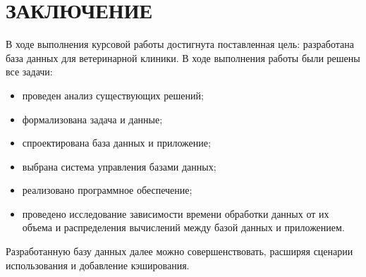 \section*{ЗАКЛЮЧЕНИЕ}

В ходе выполнения курсовой работы достигнута поставленная цель: разработана база данных для ветеринарной клиники.
В ходе выполнения работы были решены все задачи:
\begin{itemize}[label*=---]
	\item проведен анализ существующих решений;
	\item формализована задача и данные;
	\item спроектирована база данных и приложение;
	\item выбрана система управления базами данных;
	\item реализовано программное обеспечение;
	\item проведено исследование зависимости времени обработки данных от их объема и распределения вычислений между базой данных и приложением.
\end{itemize}

Разработанную базу данных далее можно совершенствовать, расширяя сценарии использования и добавление кэширования.